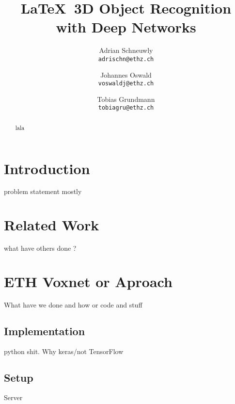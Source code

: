 \documentclass[10pt,twocolumn,letterpaper]{article}
\begin{document}
\title{\LaTeX\ 3D Object Recognition with Deep Networks}

\author{Adrian Schneuwly\\
{\tt\small adrischn@ethz.ch}
\and
Johannes Oswald\\
{\tt\small voswaldj@ethz.ch}
\and
Tobias Grundmann\\
{\tt\small tobiagru@ethz.ch}
}

\maketitle

\begin{abstract}
   lala
\end{abstract}

\section{Introduction}

problem statement mostly

\section{Related Work}

what have others done ?


\section{ETH Voxnet or Aproach}

What have we done and how
or code and stuff


\subsection{Implementation}
python shit. Why keras/not TensorFlow


\subsection{Setup}
Server
\end{document}
